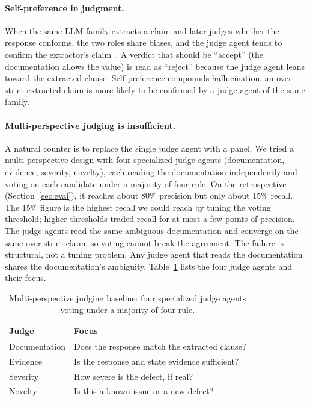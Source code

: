 \documentclass[sigconf]{acmart}
\begin{document}
\paragraph{Self-preference in judgment.}
When the same LLM family extracts a claim and later judges whether the response conforms, the two roles share biases, and the judge agent tends to confirm the extractor's claim~\cite{panickssery24}. A verdict that should be ``accept'' (the documentation allows the value) is read as ``reject'' because the judge agent leans toward the extracted clause. Self-preference compounds hallucination: an over-strict extracted claim is more likely to be confirmed by a judge agent of the same family.

\paragraph{Multi-perspective judging is insufficient.}
A natural counter is to replace the single judge agent with a panel. We tried a multi-perspective design with four specialized judge agents (documentation, evidence, severity, novelty), each reading the documentation independently and voting on each candidate under a majority-of-four rule. On the retrospective (Section~\ref{sec:eval}), it reaches about 80\% precision but only about 15\% recall. The 15\% figure is the highest recall we could reach by tuning the voting threshold; higher thresholds traded recall for at most a few points of precision. The judge agents read the same ambiguous documentation and converge on the same over-strict claim, so voting cannot break the agreement. The failure is structural, not a tuning problem. Any judge agent that reads the documentation shares the documentation's ambiguity. Table~\ref{tab:multipersp} lists the four judge agents and their focus.

\begin{table}[t]
\caption{Multi-perspective judging baseline: four specialized judge agents voting under a majority-of-four rule.}
\label{tab:multipersp}
\small
\begin{tabular}{@{}lp{}@{}}
\toprule
Judge & Focus \\
\midrule
Documentation & Does the response match the extracted clause? \\
Evidence & Is the response and state evidence sufficient? \\
Severity & How severe is the defect, if real? \\
Novelty & Is this a known issue or a new defect? \\
\bottomrule
\end{tabular}
\end{table}
\end{document}
